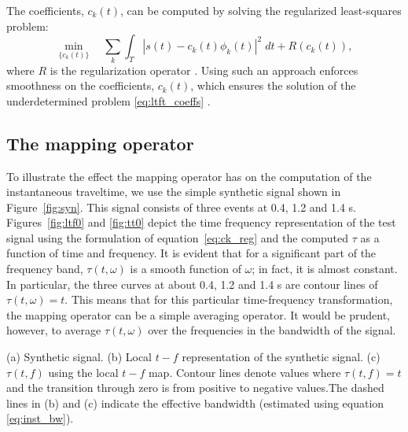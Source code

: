 The coefficients, $c_k(t)$, can be computed by solving the regularized least-squares problem: 
\begin{equation}
   \min_{\{c_k(t)\}}\quad\sum_k\int_T|s(t)-c_k(t)\phi_k(t)|^2\;dt + R(c_k(t)),\label{eq:ck_reg}
\end{equation}
where $R$ is the regularization operator \citep{liu11time-freq}. 
Using such an approach enforces smoothness on the coefficients, $c_k(t)$, which ensures the solution of the underdetermined problem \ref{eq:ltft_coeffs} \citep{fomel07shaping}.



\subsection{The mapping operator}
To illustrate the effect the mapping operator has on the computation of the instantaneous traveltime, we use the simple synthetic signal shown in Figure~\ref{fig:syn}. This signal consists of three events at 0.4, 1.2 and 1.4 s. 
Figures~\ref{fig:ltf0} and \ref{fig:tt0} depict the time frequency representation of the test signal using the formulation of equation~\ref{eq:ck_reg} and the computed $\tau$ as a function of time and frequency. It is evident that for a significant part of the frequency band, $\tau(t,\omega)$ is a smooth function of $\omega$; in fact, it is almost constant. In particular, the three curves at about 0.4, 1.2 and 1.4 s are contour lines of $\tau(t,\omega)=t$. This means that for this particular time-frequency transformation, the mapping operator can be a simple averaging operator. It would be prudent, however, to average $\tau(t,\omega)$ over the frequencies in the bandwidth of the signal. 

{(a) Synthetic signal. (b) Local $t-f$ representation of the synthetic signal. (c) $\tau(t,f)$ using the local $t-f$ map. Contour lines denote values where $\tau(t,f)=t$ and the transition through zero is from positive to negative values.\newline The dashed lines in (b) and (c) indicate the effective bandwidth (estimated using equation \ref{eq:inst_bw}).}\label{fig:syn_tf}


